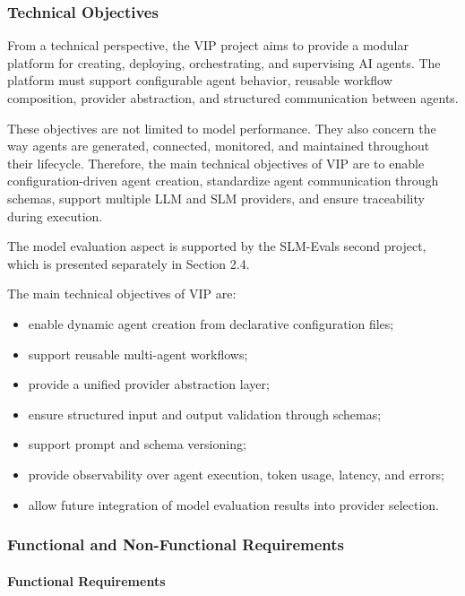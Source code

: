 \subsubsection{Technical Objectives}

From a technical perspective, the VIP project aims to provide a modular platform for creating, deploying, orchestrating, and supervising AI agents. The platform must support configurable agent behavior, reusable workflow composition, provider abstraction, and structured communication between agents.

These objectives are not limited to model performance. They also concern the way agents are generated, connected, monitored, and maintained throughout their lifecycle. Therefore, the main technical objectives of VIP are to enable configuration-driven agent creation, standardize agent communication through schemas, support multiple LLM and SLM providers, and ensure traceability during execution.

The model evaluation aspect is supported by the SLM-Evals second project, which is presented separately in Section 2.4.

The main technical objectives of VIP are:

\begin{itemize}
    \item enable dynamic agent creation from declarative configuration files;
    \item support reusable multi-agent workflows;
    \item provide a unified provider abstraction layer;
    \item ensure structured input and output validation through schemas;
    \item support prompt and schema versioning;
    \item provide observability over agent execution, token usage, latency, and errors;
    \item allow future integration of model evaluation results into provider selection.
\end{itemize}

\subsubsection{Functional and Non-Functional Requirements}

\setcounter{secnumdepth}{4}
\setcounter{tocdepth}{4}

\paragraph{Functional Requirements}

